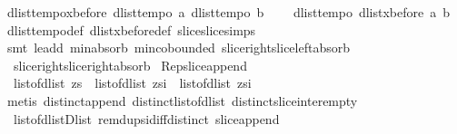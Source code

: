 \begin{isabellebody}
\isamarkuptrue%
\isamarkupfalse%
\ dlist{\isacharunderscore}tempo{}{\isacharunderscore}xbefore{\isacharcolon}\ {\isachardoublequoteopen}{\isasymlbrakk}dlist{\isacharunderscore}tempo{}\ a{\isacharsemicolon}\ dlist{\isacharunderscore}tempo{}\ b{\isasymrbrakk}\ {\isasymLongrightarrow}\ \isanewline
\ \ dlist{\isacharunderscore}tempo{}\ {\isacharparenleft}dlist{\isacharunderscore}xbefore\ a\ b{\isacharparenright}{\isachardoublequoteclose}\isanewline
%
\isadelimproof
%
\endisadelimproof
%
\isatagproof
{}\isamarkupfalse%
\ dlist{\isacharunderscore}tempo{}{\isacharunderscore}def\ dlist{\isacharunderscore}xbefore{\isacharunderscore}def\ slice{\isacharunderscore}slice{\isacharunderscore}simps\isanewline
{}\isamarkupfalse%
\ {\isacharparenleft}smt\ le{\isacharunderscore}add{}\ min{\isachardot}absorb{}\ min{\isachardot}cobounded{}\ slice{\isacharunderscore}right{\isacharunderscore}slice{\isacharunderscore}left{\isacharunderscore}absorb\ \isanewline
\ \ slice{\isacharunderscore}right{\isacharunderscore}slice{\isacharunderscore}right{\isacharunderscore}absorb{\isacharparenright}%
\endisatagproof
{\isafoldproof}%
%
\isadelimproof
%
\endisadelimproof
%
\isamarkuptrue%
\isamarkupfalse%
\ Rep{\isacharunderscore}slice{\isacharunderscore}append{\isacharcolon}\ \isanewline
\ \ {\isachardoublequoteopen}list{\isacharunderscore}of{\isacharunderscore}dlist\ zs\ {\isacharequal}\ {\isacharparenleft}list{\isacharunderscore}of{\isacharunderscore}dlist\ {\isacharparenleft}zs{\isasymdagger}{\isachardot}{\isachardot}i{\isacharparenright}{\isacharparenright}\ {\isacharat}\ {\isacharparenleft}list{\isacharunderscore}of{\isacharunderscore}dlist\ {\isacharparenleft}zs{\isasymdagger}i{\isachardot}{\isachardot}{\isacharparenright}{\isacharparenright}{\isachardoublequoteclose}\isanewline
%
\isadelimproof
%
\endisadelimproof
%
\isatagproof
{}\isamarkupfalse%
\ {\isacharparenleft}metis\ distinct{\isacharunderscore}append\ distinct{\isacharunderscore}list{\isacharunderscore}of{\isacharunderscore}dlist\ distinct{\isacharunderscore}slice{\isacharunderscore}inter{\isacharunderscore}empty\ \isanewline
\ \ list{\isacharunderscore}of{\isacharunderscore}dlist{\isacharunderscore}Dlist\ remdups{\isacharunderscore}id{\isacharunderscore}iff{\isacharunderscore}distinct\ slice{\isacharunderscore}append{\isacharparenright}%

\end{isabellebody}
